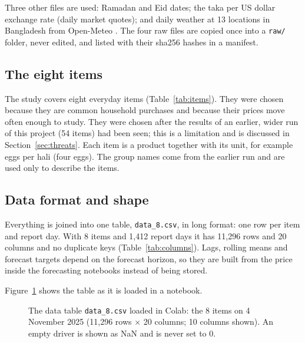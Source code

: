 Three other files are used: Ramadan and Eid dates; the taka per US dollar exchange rate (daily market quotes); and daily weather at 13 locations in Bangladesh from Open-Meteo \cite{openmeteo}. The four raw files are copied once into a \texttt{raw/} folder, never edited, and listed with their sha256 hashes in a manifest.

\subsection{The eight items}
The study covers eight everyday items (Table~\ref{tab:items}). They were chosen because they are common household purchases and because their prices move often enough to study. They were chosen after the results of an earlier, wider run of this project (54 items) had been seen; this is a limitation and is discussed in Section~\ref{sec:threats}. Each item is a product together with its unit, for example eggs per hali (four eggs). The group names come from the earlier run and are used only to describe the items.

\begin{table}[H]\centering\small
\caption[The eight items]{The eight items, their units, groups, the cost drivers used for each, and the share of report days on which the price is missing.}\label{tab:items}
\fittab{}
\end{table}

\subsection{Data format and shape}
Everything is joined into one table, \texttt{data\_8.csv}, in long format: one row per item and report day. With 8 items and 1,412 report days it has 11,296 rows and 20 columns and no duplicate keys (Table~\ref{tab:columns}). Lags, rolling means and forecast targets depend on the forecast horizon, so they are built from the price inside the forecasting notebooks instead of being stored.

\begin{table}[H]\centering\small
\caption[Columns of the data table]{Columns of \texttt{data\_8.csv}.}\label{tab:columns}
\fittab{}
\end{table}

Figure~\ref{fig:datatable} shows the table as it is loaded in a notebook.

\begin{figure}[H]
\centering
{}
\caption[The data table in the notebook]{The data table \texttt{data\_8.csv} loaded in Colab: the 8 items on 4 November 2025 (11,296 rows $\times$ 20 columns; 10 columns shown). An empty driver is shown as NaN and is never set to 0.}
\label{fig:datatable}
\end{figure}

